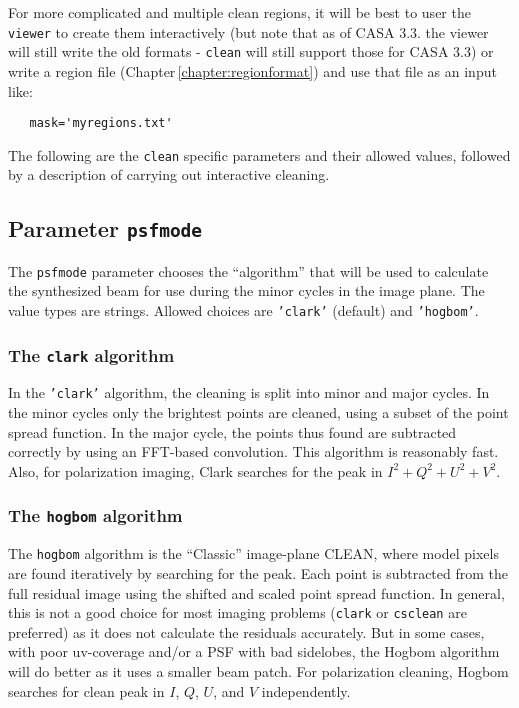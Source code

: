 For more complicated and multiple clean regions, it will be best to
user the {\tt viewer} to create them interactively (but note that as
of CASA 3.3. the viewer will still write the old formats - {\tt clean}
will still support those for CASA 3.3) or write a region file
(Chapter\,\ref{chapter:regionformat}) and use that file as an input
like:

\begin{verbatim}
   mask='myregions.txt' 
\end{verbatim}
\normalsize

The following are the {\tt clean} specific parameters and their
allowed values, followed by a description of carrying out 
interactive cleaning.

\subsection{Parameter {\tt psfmode}}
\label{section:im.clean.psfmode}

The {\tt psfmode} parameter chooses the ``algorithm'' that will be used
to calculate the synthesized beam for use during the minor cycles in
the image plane. The value types are strings.
Allowed choices are {\tt 'clark'} (default) and {\tt 'hogbom'}. 

\subsubsection{The {\tt clark} algorithm}
\label{section:im.clean.psfmode.clark}

In the {\tt 'clark'} algorithm, the cleaning is split into minor and
major cycles. In the minor cycles only the brightest points are
cleaned, using a subset of the point spread function. In the major
cycle, the points thus found are subtracted correctly by using an
FFT-based convolution.  This algorithm is reasonably fast.
Also, for polarization imaging, Clark searches for the peak in 
$I^2+Q^2+U^2+V^2$.

\subsubsection{The {\tt hogbom} algorithm}
\label{section:im.clean.psfmode.hogbom}

The {\tt hogbom} algorithm is the ``Classic'' image-plane CLEAN, where
model pixels are found iteratively by searching for the peak. Each
point is subtracted from the full residual image using the shifted and
scaled point spread function.  In general, this is not a good choice for most
imaging problems ({\tt clark} or {\tt csclean} are preferred) as it does not
calculate the residuals accurately.  But in some cases, with poor
uv-coverage and/or a PSF with bad sidelobes, the Hogbom algorithm will
do better as it uses a smaller beam patch.  For polarization cleaning,
Hogbom searches for clean peak in $I$, $Q$, $U$, and $V$ independently.

